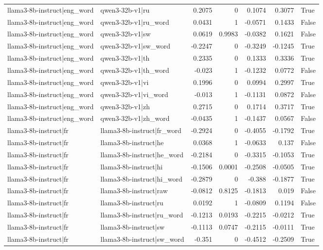 \begin{table}
\begin{tabular}{l l r r r r l}
llama3-8b-instruct|eng_word & qwen3-32b-v1|ru & 0.2075 & 0 & 0.1074 & 0.3077 & True \\
llama3-8b-instruct|eng_word & qwen3-32b-v1|ru_word & 0.0431 & 1 & -0.0571 & 0.1433 & False \\
llama3-8b-instruct|eng_word & qwen3-32b-v1|sw & 0.0619 & 0.9983 & -0.0382 & 0.1621 & False \\
llama3-8b-instruct|eng_word & qwen3-32b-v1|sw_word & -0.2247 & 0 & -0.3249 & -0.1245 & True \\
llama3-8b-instruct|eng_word & qwen3-32b-v1|th & 0.2335 & 0 & 0.1333 & 0.3336 & True \\
llama3-8b-instruct|eng_word & qwen3-32b-v1|th_word & -0.023 & 1 & -0.1232 & 0.0772 & False \\
llama3-8b-instruct|eng_word & qwen3-32b-v1|vi & 0.1996 & 0 & 0.0994 & 0.2997 & True \\
llama3-8b-instruct|eng_word & qwen3-32b-v1|vi_word & -0.013 & 1 & -0.1131 & 0.0872 & False \\
llama3-8b-instruct|eng_word & qwen3-32b-v1|zh & 0.2715 & 0 & 0.1714 & 0.3717 & True \\
llama3-8b-instruct|eng_word & qwen3-32b-v1|zh_word & -0.0435 & 1 & -0.1437 & 0.0567 & False \\
llama3-8b-instruct|fr & llama3-8b-instruct|fr_word & -0.2924 & 0 & -0.4055 & -0.1792 & True \\
llama3-8b-instruct|fr & llama3-8b-instruct|he & 0.0368 & 1 & -0.0633 & 0.137 & False \\
llama3-8b-instruct|fr & llama3-8b-instruct|he_word & -0.2184 & 0 & -0.3315 & -0.1053 & True \\
llama3-8b-instruct|fr & llama3-8b-instruct|hi & -0.1506 & 0.0001 & -0.2508 & -0.0505 & True \\
llama3-8b-instruct|fr & llama3-8b-instruct|hi_word & -0.2879 & 0 & -0.388 & -0.1877 & True \\
llama3-8b-instruct|fr & llama3-8b-instruct|raw & -0.0812 & 0.8125 & -0.1813 & 0.019 & False \\
llama3-8b-instruct|fr & llama3-8b-instruct|ru & 0.0192 & 1 & -0.0809 & 0.1194 & False \\
llama3-8b-instruct|fr & llama3-8b-instruct|ru_word & -0.1213 & 0.0193 & -0.2215 & -0.0212 & True \\
llama3-8b-instruct|fr & llama3-8b-instruct|sw & -0.1113 & 0.0747 & -0.2115 & -0.0111 & True \\
llama3-8b-instruct|fr & llama3-8b-instruct|sw_word & -0.351 & 0 & -0.4512 & -0.2509 & True \\

\end{tabular}
\end{table}
